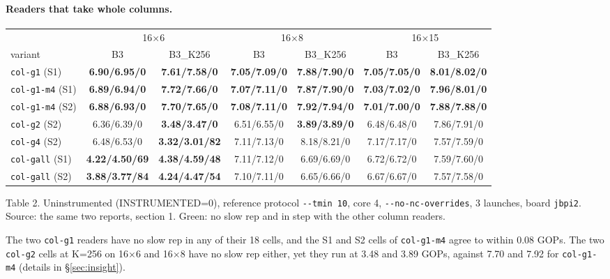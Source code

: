 \documentclass[10pt,a4paper]{article}
\newcommand{\good}[1]{\textcolor{green!45!black}{\textbf{#1}}}
\newcommand{\bad}[1]{\textcolor{red!70!black}{\textbf{#1}}}
\begin{document}
\paragraph{Readers that take whole columns.}
\begin{center}\footnotesize\setlength{\tabcolsep}{2.8pt}
\begin{tabular}{@{}lcccccc@{}}
\toprule
 & \multicolumn{2}{c}{16$\times$6} & \multicolumn{2}{c}{16$\times$8} & \multicolumn{2}{c}{16$\times$15} \\
\cmidrule(lr){2-3}\cmidrule(lr){4-5}\cmidrule(lr){6-7}
variant & B3 & B3\_K256 & B3 & B3\_K256 & B3 & B3\_K256 \\
\midrule
\texttt{col-g1} (S1) & \good{6.90/6.95/0} & \good{7.61/7.58/0} & \good{7.05/7.09/0} & \good{7.88/7.90/0} & \good{7.05/7.05/0} & \good{8.01/8.02/0} \\
\texttt{col-g1-m4} (S1) & \good{6.89/6.94/0} & \good{7.72/7.66/0} & \good{7.07/7.11/0} & \good{7.87/7.90/0} & \good{7.03/7.02/0} & \good{7.96/8.01/0} \\
\texttt{col-g1-m4} (S2) & \good{6.88/6.93/0} & \good{7.70/7.65/0} & \good{7.08/7.11/0} & \good{7.92/7.94/0} & \good{7.01/7.00/0} & \good{7.88/7.88/0} \\
\texttt{col-g2} (S2) & 6.36/6.39/0 & \bad{3.48/3.47/0} & 6.51/6.55/0 & \bad{3.89/3.89/0} & 6.48/6.48/0 & 7.86/7.91/0 \\
\texttt{col-g4} (S2) & 6.48/6.53/0 & \bad{3.32/3.01/82} & 7.11/7.13/0 & 8.18/8.21/0 & 7.17/7.17/0 & 7.57/7.59/0 \\
\texttt{col-gall} (S1) & \bad{4.22/4.50/69} & \bad{4.38/4.59/48} & 7.11/7.12/0 & 6.69/6.69/0 & 6.72/6.72/0 & 7.59/7.60/0 \\
\texttt{col-gall} (S2) & \bad{3.88/3.77/84} & \bad{4.24/4.47/54} & 7.10/7.11/0 & 6.65/6.66/0 & 6.67/6.67/0 & 7.57/7.58/0 \\
\bottomrule
\end{tabular}
\end{center}
{\footnotesize Table 2. Uninstrumented (INSTRUMENTED=0), reference protocol \texttt{-{}-tmin 10}, core 4, \texttt{-{}-no-nc-overrides}, 3 launches, board \texttt{jbpi2}.
Source: the same two reports, section 1. Green: no slow rep and in step with the other column readers.}

The two \texttt{col-g1} readers have no slow rep in any of their 18 cells, and the S1 and S2 cells of \texttt{col-g1-m4} agree to within
0.08 GOPs. The two \texttt{col-g2} cells at K=256 on 16$\times$6 and 16$\times$8 have no slow rep either, yet they run at
3.48 and 3.89 GOPs, against 7.70 and 7.92 for \texttt{col-g1-m4} (details in \S\ref{sec:insight}).
\end{document}
